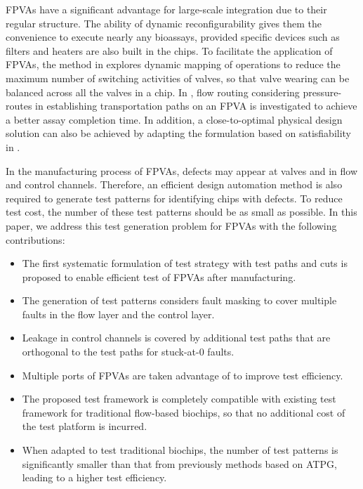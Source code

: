 \documentclass[journal,twoside]{IEEEtran}
\begin{document}
FPVAs have a significant advantage for large-scale integration
due to their regular structure.
The ability of dynamic reconfigurability gives
them the convenience to execute nearly any bioassays, provided specific devices
such as filters and heaters are also built in the chips. 
To facilitate the application of FPVAs, 
the method in \cite{TsengLHS15,TBMTtcad} explores
dynamic mapping of operations to reduce the
maximum number of switching activities of valves, so that valve wearing can be balanced
across all the valves in a chip.
In \cite{pump}, flow routing considering
pressure-routes in establishing transportation paths on an FPVA is investigated
to achieve a better assay completion time. In addition, a
close-to-optimal physical design solution can also be achieved by adapting the
formulation based on satisfiability in \cite{grimmer2017close}.



In the manufacturing process of FPVAs, defects may appear 
at valves and in flow and control channels.
Therefore, 
an efficient design automation method is also required to generate test patterns
for identifying chips with defects. To reduce test cost, the number of these test
patterns should be as small as possible.
In this paper, we address this test generation problem for FPVAs 
with the following contributions:

\begin{itemize}

\item The first systematic formulation of test strategy with test paths and cuts 
  is proposed to enable efficient test of FPVAs after manufacturing.

\item The generation of test patterns
  considers fault masking 
  to cover multiple faults in the flow layer and the control layer.

\item Leakage in control channels is covered by additional test
  paths that are orthogonal to the test paths for stuck-at-0 faults.
  
\item Multiple ports of FPVAs are taken advantage of to improve test
  efficiency. 
  
\item The proposed test framework is completely compatible with existing test
  framework for traditional flow-based biochips,
  so that no additional cost of the test platform is incurred. 
  
\item  When adapted to test traditional biochips, the number of test patterns
  is significantly smaller than that from previously methods based on ATPG, leading
  to a higher test efficiency.

\end{itemize}
\end{document}
